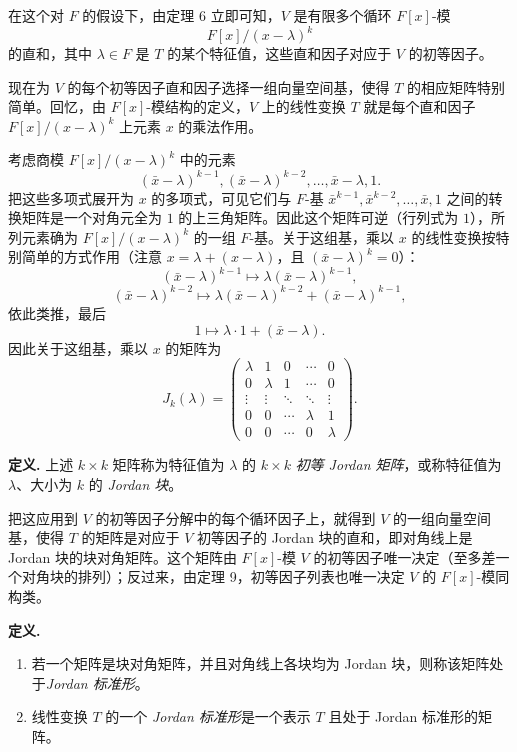 在这个对 $F$ 的假设下，由定理 6 立即可知，$V$ 是有限多个循环 $F[x]$-模
\[
F[x]/(x-\lambda)^k
\]
的直和，其中 $\lambda\in F$ 是 $T$ 的某个特征值，这些直和因子对应于 $V$ 的初等因子。

现在为 $V$ 的每个初等因子直和因子选择一组向量空间基，使得 $T$ 的相应矩阵特别简单。回忆，由 $F[x]$-模结构的定义，$V$ 上的线性变换 $T$ 就是每个直和因子 $F[x]/(x-\lambda)^k$ 上元素 $x$ 的乘法作用。

考虑商模 $F[x]/(x-\lambda)^k$ 中的元素
\[
(\bar x-\lambda)^{k-1},(\bar x-\lambda)^{k-2},\ldots,\bar x-\lambda,1.
\]
把这些多项式展开为 $x$ 的多项式，可见它们与 $F$-基 $\bar x^{k-1},\bar x^{k-2},\ldots,\bar x,1$ 之间的转换矩阵是一个对角元全为 $1$ 的上三角矩阵。因此这个矩阵可逆（行列式为 $1$），所列元素确为 $F[x]/(x-\lambda)^k$ 的一组 $F$-基。关于这组基，乘以 $x$ 的线性变换按特别简单的方式作用（注意 $x=\lambda+(x-\lambda)$，且 $(\bar x-\lambda)^k=0$）：
\[
(\bar x-\lambda)^{k-1}\mapsto \lambda(\bar x-\lambda)^{k-1},
\]
\[
(\bar x-\lambda)^{k-2}\mapsto \lambda(\bar x-\lambda)^{k-2}+(\bar x-\lambda)^{k-1},
\]
依此类推，最后
\[
1\mapsto \lambda\cdot1+(\bar x-\lambda).
\]
因此关于这组基，乘以 $x$ 的矩阵为
\[
J_k(\lambda)=
\begin{pmatrix}
\lambda&1&0&\cdots&0\\
0&\lambda&1&\cdots&0\\
\vdots&\vdots&\ddots&\ddots&\vdots\\
0&0&\cdots&\lambda&1\\
0&0&\cdots&0&\lambda
\end{pmatrix}.
\]

\noindent\textbf{定义.} 上述 $k\times k$ 矩阵称为特征值为 $\lambda$ 的 $k\times k$ \emph{初等 Jordan 矩阵}，或称特征值为 $\lambda$、大小为 $k$ 的 \emph{Jordan 块}。

把这应用到 $V$ 的初等因子分解中的每个循环因子上，就得到 $V$ 的一组向量空间基，使得 $T$ 的矩阵是对应于 $V$ 初等因子的 Jordan 块的直和，即对角线上是 Jordan 块的块对角矩阵。这个矩阵由 $F[x]$-模 $V$ 的初等因子唯一决定（至多差一个对角块的排列）；反过来，由定理 9，初等因子列表也唯一决定 $V$ 的 $F[x]$-模同构类。

\noindent\textbf{定义.}
\begin{enumerate}[label=(\arabic*)]
\item 若一个矩阵是块对角矩阵，并且对角线上各块均为 Jordan 块，则称该矩阵处于\emph{Jordan 标准形}。
\item 线性变换 $T$ 的一个 \emph{Jordan 标准形}是一个表示 $T$ 且处于 Jordan 标准形的矩阵。
\end{enumerate}

